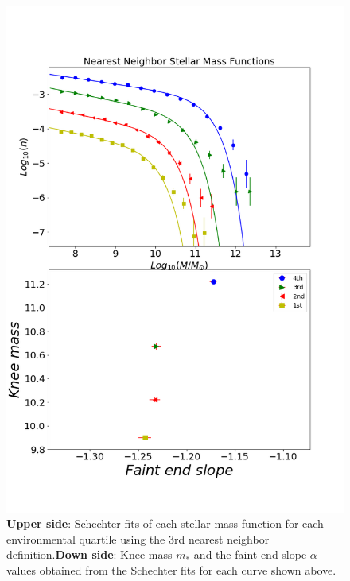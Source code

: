 \documentclass[a4paper,fleqn,usenatbib]{mnras}
\begin{document}
\begin{figure}
	\includegraphics[width=\columnwidth]{./pics/quartilesSellar.png}
    \caption{\textbf{Upper side}: Schechter fits of each stellar mass function for each environmental quartile using the 3rd nearest neighbor definition.\textbf{Down side}: Knee-mass $m_\ast$ and the faint end slope $\alpha$ values obtained from the Schechter fits for each curve shown above.}
    \label{fig:quartilesStellar}
\end{figure}
\end{document}
